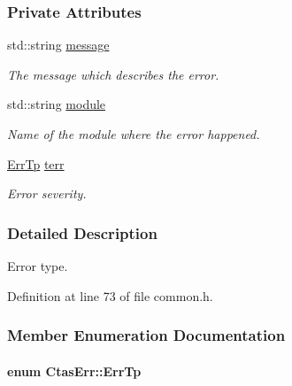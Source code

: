 \subsubsection*{Private Attributes}
\begin{DoxyCompactItemize}
\item 
std::string \hyperlink{classCtasErr_a9814f39f8f3c93d77d45209c8808a591}{message}
\begin{DoxyCompactList}\small\item\em The message which describes the error. \item\end{DoxyCompactList}\item 
std::string \hyperlink{classCtasErr_a9ff7fe473d7b44c9d7e3bace22e24eff}{module}
\begin{DoxyCompactList}\small\item\em Name of the module where the error happened. \item\end{DoxyCompactList}\item 
\hyperlink{classCtasErr_af961b70f6bb7cf20075131c79b049654}{ErrTp} \hyperlink{classCtasErr_a316f1b4382d548d47413aff1b57c18e3}{terr}
\begin{DoxyCompactList}\small\item\em Error severity. \item\end{DoxyCompactList}\end{DoxyCompactItemize}


\subsubsection{Detailed Description}
Error type. 

Definition at line 73 of file common.h.



\subsubsection{Member Enumeration Documentation}
\hypertarget{classCtasErr_af961b70f6bb7cf20075131c79b049654}{
\paragraph[{ErrTp}]{\setlength{\rightskip}{0pt plus 5cm}enum {\bf CtasErr::ErrTp}}\hfill}
\label{classCtasErr_af961b70f6bb7cf20075131c79b049654}


